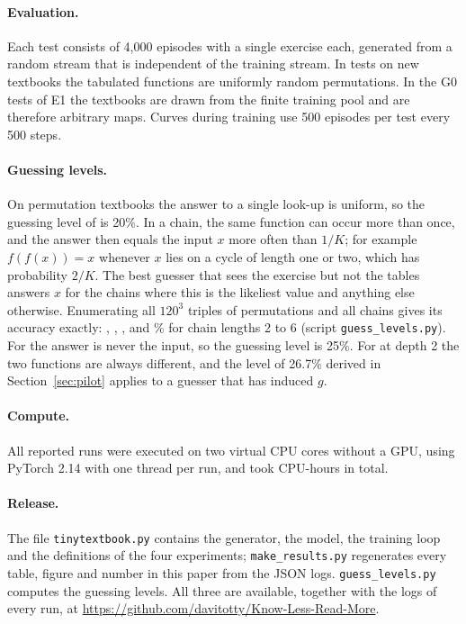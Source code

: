 \paragraph{Evaluation.}
Each test consists of 4{,}000 episodes with a single exercise each, generated from a random stream that is independent of the training stream.
In tests on new textbooks the tabulated functions are uniformly random permutations.
In the G0 tests of E1 the textbooks are drawn from the finite training pool and are therefore arbitrary maps.
Curves during training use 500 episodes per test every 500 steps.

\paragraph{Guessing levels.}
On permutation textbooks the answer to a single look-up is uniform, so the guessing level of  is 20\%.
In a chain, the same function can occur more than once, and the answer then equals the input $x$ more often than $1/K$; for example $f(f(x)) = x$ whenever $x$ lies on a cycle of length one or two, which has probability $2/K$.
The best guesser that sees the exercise but not the tables answers $x$ for the chains where this is the likeliest value and anything else otherwise.
Enumerating all $120^3$ triples of permutations and all chains gives its accuracy exactly: \GuessTwo, \GuessThree, \GuessFour, \GuessFive{} and \GuessSix\% for chain lengths 2 to 6 (script \texttt{guess\_levels.py}).
For  the answer is never the input, so the guessing level is 25\%.
For  at depth 2 the two functions are always different, and the level of 26.7\% derived in Section~\ref{sec:pilot} applies to a guesser that has induced $g$.

\paragraph{Compute.}
All \TotalRuns{} reported runs were executed on two virtual CPU cores without a GPU, using PyTorch 2.14 with one thread per run, and took \TotalCpuHours{} CPU-hours in total.

\paragraph{Release.}
The file \texttt{tinytextbook.py} contains the generator, the model, the training loop and the definitions of the four experiments; \texttt{make\_results.py} regenerates every table, figure and number in this paper from the JSON logs.
\texttt{guess\_levels.py} computes the guessing levels.
All three are available, together with the logs of every run, at \url{https://github.com/davitotty/Know-Less-Read-More}.

